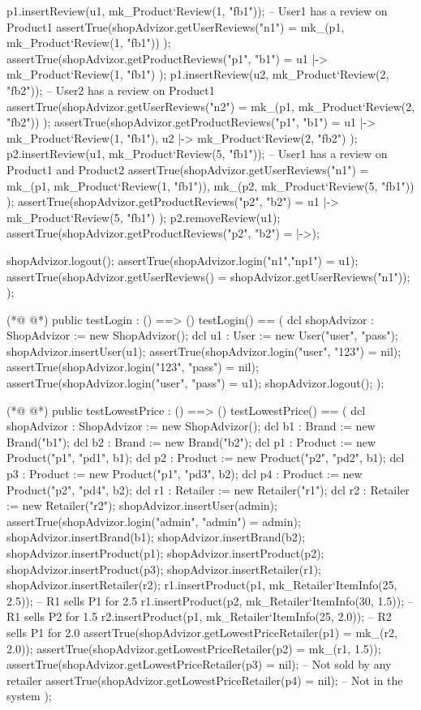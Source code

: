 \begin{vdmpp}[breaklines=true]
  p1.insertReview(u1, mk_Product`Review(1, "fb1")); -- User1 has a review on Product1
  assertTrue(shopAdvizor.getUserReviews("n1") = { mk_(p1, mk_Product`Review(1, "fb1")) }); 
  assertTrue(shopAdvizor.getProductReviews("p1", "b1") = { u1 |-> mk_Product`Review(1, "fb1") }); 
  p1.insertReview(u2, mk_Product`Review(2, "fb2")); -- User2 has a review on Product1
  assertTrue(shopAdvizor.getUserReviews("n2") = { mk_(p1, mk_Product`Review(2, "fb2")) }); 
  assertTrue(shopAdvizor.getProductReviews("p1", "b1") = { u1 |-> mk_Product`Review(1, "fb1"), u2 |-> mk_Product`Review(2, "fb2") });
  p2.insertReview(u1, mk_Product`Review(5, "fb1")); -- User1 has a review on Product1 and Product2
  assertTrue(shopAdvizor.getUserReviews("n1") = { mk_(p1, mk_Product`Review(1, "fb1")), mk_(p2, mk_Product`Review(5, "fb1")) });
  assertTrue(shopAdvizor.getProductReviews("p2", "b2") = { u1 |-> mk_Product`Review(5, "fb1") }); 
  p2.removeReview(u1);
  assertTrue(shopAdvizor.getProductReviews("p2", "b2") = {|->});
  
  shopAdvizor.logout();
  assertTrue(shopAdvizor.login("n1","np1") = u1);
  assertTrue(shopAdvizor.getUserReviews() = shopAdvizor.getUserReviews("n1"));
  );
  
(*@
\label{testLogin:119}
@*)
  public testLogin : () ==> ()
  testLogin() == 
  (
     dcl shopAdvizor : ShopAdvizor := new ShopAdvizor();
     dcl u1 : User := new User("user", "pass");
   shopAdvizor.insertUser(u1);
   assertTrue(shopAdvizor.login("user", "123") = nil);
   assertTrue(shopAdvizor.login("123", "pass") = nil);
   assertTrue(shopAdvizor.login("user", "pass") = u1);
   shopAdvizor.logout();
  );
  
(*@
\label{testLowestPrice:131}
@*)
  public testLowestPrice : () ==> ()
  testLowestPrice() == 
  (
   dcl shopAdvizor : ShopAdvizor := new ShopAdvizor();
   dcl b1 : Brand := new Brand("b1");
   dcl b2 : Brand := new Brand("b2");
  dcl p1 : Product := new Product("p1", "pd1", b1);
  dcl p2 : Product := new Product("p2", "pd2", b1);
  dcl p3 : Product := new Product("p1", "pd3", b2);
  dcl p4 : Product := new Product("p2", "pd4", b2);
  dcl r1 : Retailer := new Retailer("r1");
  dcl r2 : Retailer := new Retailer("r2");
  shopAdvizor.insertUser(admin);
  assertTrue(shopAdvizor.login("admin", "admin") = admin);
  shopAdvizor.insertBrand(b1);
  shopAdvizor.insertBrand(b2);
  shopAdvizor.insertProduct(p1);
  shopAdvizor.insertProduct(p2);
  shopAdvizor.insertProduct(p3);
  shopAdvizor.insertRetailer(r1);
  shopAdvizor.insertRetailer(r2);
  r1.insertProduct(p1, mk_Retailer`ItemInfo(25, 2.5)); -- R1 sells P1 for 2.5
  r1.insertProduct(p2, mk_Retailer`ItemInfo(30, 1.5)); -- R1 sells P2 for 1.5
  r2.insertProduct(p1, mk_Retailer`ItemInfo(25, 2.0)); -- R2 sells P1 for 2.0
  assertTrue(shopAdvizor.getLowestPriceRetailer(p1) = mk_(r2, 2.0));
  assertTrue(shopAdvizor.getLowestPriceRetailer(p2) = mk_(r1, 1.5));
  assertTrue(shopAdvizor.getLowestPriceRetailer(p3) = nil); -- Not sold by any retailer
  assertTrue(shopAdvizor.getLowestPriceRetailer(p4) = nil); -- Not in the system
  );
  

\end{vdmpp}
